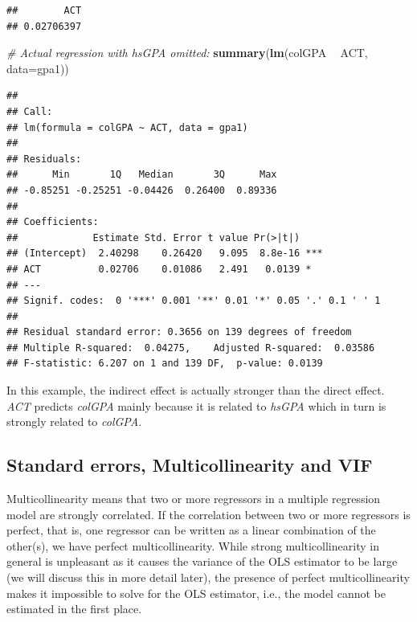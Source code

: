 \documentclass[]{book}
\newenvironment{Shaded}{\begin{snugshade}}{\end{snugshade}}
\newcommand{\CommentTok}[1]{\textcolor[rgb]{0.56,0.35,0.01}{\textit{#1}}}
\newcommand{\DataTypeTok}[1]{\textcolor[rgb]{0.13,0.29,0.53}{#1}}
\newcommand{\KeywordTok}[1]{\textcolor[rgb]{0.13,0.29,0.53}{\textbf{#1}}}
\newcommand{\NormalTok}[1]{#1}
\newcommand{\OperatorTok}[1]{\textcolor[rgb]{0.81,0.36,0.00}{\textbf{#1}}}
\newcommand{\StringTok}[1]{\textcolor[rgb]{0.31,0.60,0.02}{#1}}
\begin{document}
\begin{verbatim}
##        ACT 
## 0.02706397
\end{verbatim}

\begin{Shaded}
\begin{Highlighting}[]
\CommentTok{# Actual regression with hsGPA omitted:}
\KeywordTok{summary}\NormalTok{(}\KeywordTok{lm}\NormalTok{(colGPA }\OperatorTok{~}\StringTok{ }\NormalTok{ACT, }\DataTypeTok{data=}\NormalTok{gpa1))}
\end{Highlighting}
\end{Shaded}

\begin{verbatim}
## 
## Call:
## lm(formula = colGPA ~ ACT, data = gpa1)
## 
## Residuals:
##      Min       1Q   Median       3Q      Max 
## -0.85251 -0.25251 -0.04426  0.26400  0.89336 
## 
## Coefficients:
##             Estimate Std. Error t value Pr(>|t|)    
## (Intercept)  2.40298    0.26420   9.095  8.8e-16 ***
## ACT          0.02706    0.01086   2.491   0.0139 *  
## ---
## Signif. codes:  0 '***' 0.001 '**' 0.01 '*' 0.05 '.' 0.1 ' ' 1
## 
## Residual standard error: 0.3656 on 139 degrees of freedom
## Multiple R-squared:  0.04275,    Adjusted R-squared:  0.03586 
## F-statistic: 6.207 on 1 and 139 DF,  p-value: 0.0139
\end{verbatim}

In this example, the indirect effect is actually stronger than the direct effect. \emph{ACT} predicts \emph{colGPA} mainly because it is related to \emph{hsGPA} which in turn is strongly related to \emph{colGPA}.

\hypertarget{standard-errors-multicollinearity-and-vif}{%
\subsection{Standard errors, Multicollinearity and VIF}\label{standard-errors-multicollinearity-and-vif}}

Multicollinearity means that two or more regressors in a multiple regression model are strongly correlated. If the correlation between two or more regressors is perfect, that is, one regressor can be written as a linear combination of the other(s), we have perfect multicollinearity. While strong multicollinearity in general is unpleasant as it causes the variance of the OLS estimator to be large (we will discuss this in more detail later), the presence of perfect multicollinearity makes it impossible to solve for the OLS estimator, i.e., the model cannot be estimated in the first place.
\end{document}
